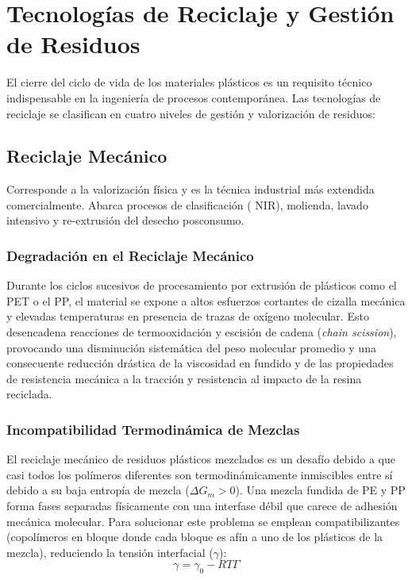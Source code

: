 \chapter{Tecnologías de Reciclaje y Gestión de Residuos}
\label{cap:reciclaje}

El cierre del ciclo de vida de los materiales plásticos es un requisito técnico indispensable en la ingeniería de procesos contemporánea. Las tecnologías de reciclaje se clasifican en cuatro niveles de gestión y valorización de residuos:

\section{Reciclaje Mecánico}

Corresponde a la valorización física y es la técnica industrial más extendida comercialmente. Abarca procesos de clasificación ( NIR), molienda, lavado intensivo y re-extrusión del desecho posconsumo.

\subsection{Degradación en el Reciclaje Mecánico}
Durante los ciclos sucesivos de procesamiento por extrusión de plásticos como el PET o el PP, el material se expone a altos esfuerzos cortantes de cizalla mecánica y elevadas temperaturas en presencia de trazas de oxígeno molecular. Esto desencadena reacciones de termooxidación y escisión de cadena (\textit{chain scission}), provocando una disminución sistemática del peso molecular promedio y una consecuente reducción drástica de la viscosidad en fundido y de las propiedades de resistencia mecánica a la tracción y resistencia al impacto de la resina reciclada.

\subsection{Incompatibilidad Termodinámica de Mezclas}
El reciclaje mecánico de residuos plásticos mezclados es un desafío debido a que casi todos los polímeros diferentes son termodinámicamente inmiscibles entre sí debido a su baja entropía de mezcla ($\Delta G_m > 0$). Una mezcla fundida de PE y PP forma fases separadas físicamente con una interfase débil que carece de adhesión mecánica molecular. Para solucionar este problema se emplean compatibilizantes (copolímeros en bloque donde cada bloque es afín a uno de los plásticos de la mezcla), reduciendo la tensión interfacial ($\gamma$):
\begin{equation}
    \gamma = \gamma_0 - R T \Gamma
    \label{eq:compatibilizacion}
\end{equation}

